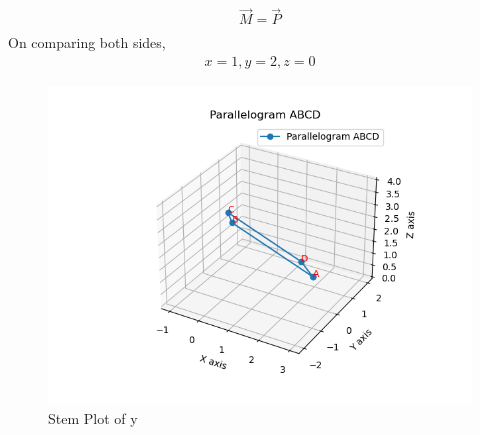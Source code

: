 \documentclass[journal]{IEEEtran}
\begin{document}
\begin{align}
\vec{M} = \vec{P} \\
\end{align}
On comparing both sides, 
\begin{align}
x=1, y=2, z=0
\end{align}
\begin{figure}[h!]
   \centering
   \includegraphics[width=0.7\linewidth]{figs/Figure_1.png}
   \caption{Stem Plot of y}
   \label{stemplot}
\end{figure}
\end{document}
